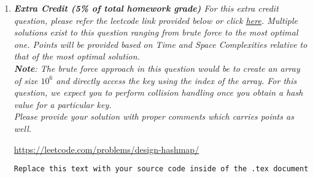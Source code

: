 \documentclass[12pt]{article}
\begin{document}
\begin{enumerate}
\begin{enumerate}[label=(\alph*)]
    \end{enumerate}


	
	
\clearpage
    
    \item{\itshape \textbf{Extra Credit (5\% of total homework grade)}
    For this extra credit question, please refer the leetcode link provided below or click \href{https://leetcode.com/problems/design-hashmap/}{here}. Multiple solutions exist to this question ranging from brute force to the most optimal one. Points will be provided based on Time and Space Complexities relative to that of the most optimal solution. \\
    
    \textbf{Note}: The brute force approach in this question would be to create an array of size $10^6$ and directly access the key using the index of the array. For this question, we expect you to perform collision handling once you obtain a hash value for a particular key. \\
    
    Please provide your solution with proper comments which carries points as well.}
    
   \url{https://leetcode.com/problems/design-hashmap/}

\begin{verbatim}
Replace this text with your source code inside of the .tex document
\end{verbatim}
	

\end{enumerate}
\end{document}
